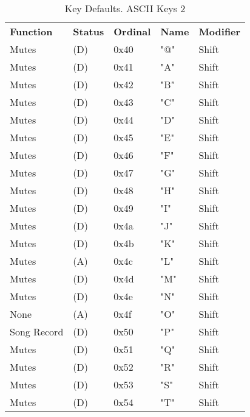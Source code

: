    \begin{table}[htb!]
      \centering
      \caption{Key Defaults. ASCII Keys 2}
      \label{table:key_defaults_ascii_keys_2}
      \begin{tabular}{l l l l l}
        \textbf{Function} & \textbf{Status} & \textbf{Ordinal} & \textbf{Name} & \textbf{Modifier} \\
        Mutes              & (D)  &  0x40   & "@"          & Shift \\
        Mutes              & (D)  &  0x41   & "A"          & Shift \\
        Mutes              & (D)  &  0x42   & "B"          & Shift \\
        Mutes              & (D)  &  0x43   & "C"          & Shift \\
        Mutes              & (D)  &  0x44   & "D"          & Shift \\
        Mutes              & (D)  &  0x45   & "E"          & Shift \\
        Mutes              & (D)  &  0x46   & "F"          & Shift \\
        Mutes              & (D)  &  0x47   & "G"          & Shift \\
        Mutes              & (D)  &  0x48   & "H"          & Shift \\
        Mutes              & (D)  &  0x49   & "I"          & Shift \\
        Mutes              & (D)  &  0x4a   & "J"          & Shift \\
        Mutes              & (D)  &  0x4b   & "K"          & Shift \\
        Mutes              & (A)  &  0x4c   & "L"          & Shift \\
        Mutes              & (D)  &  0x4d   & "M"          & Shift \\
        Mutes              & (D)  &  0x4e   & "N"          & Shift \\
        None               & (A)  &  0x4f   & "O"          & Shift \\
        Song Record        & (D)  &  0x50   & "P"          & Shift \\
        Mutes              & (D)  &  0x51   & "Q"          & Shift \\
        Mutes              & (D)  &  0x52   & "R"          & Shift \\
        Mutes              & (D)  &  0x53   & "S"          & Shift \\
        Mutes              & (D)  &  0x54   & "T"          & Shift \\

\end{tabular}
\end{table}
